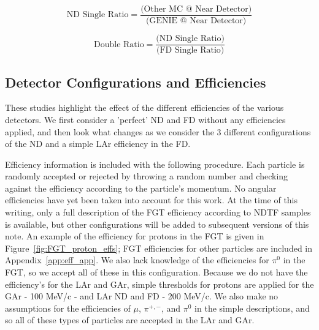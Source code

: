 \documentclass[12pt]{article}
\begin{document}
\begin{equation}
\label{eq:single_ratio}
\textrm{ND Single Ratio} = \frac{\textrm{(Other MC @ Near Detector)}}{\textrm{(GENIE @ Near Detector)}}
\end{equation}

\begin{equation}
\label{eq:double_ratio}
\textrm{Double Ratio} = \frac{\textrm{(ND Single Ratio)}}{\textrm{(FD Single Ratio)}}
\end{equation}

\subsection{Detector Configurations and Efficiencies}
\label{subsec:eff}
These studies highlight the effect of the different efficiencies of the various detectors. We first consider a 'perfect' ND and FD without any efficiencies applied, and then look what changes as we consider the 3 different configurations of the ND and a simple LAr efficiency in the FD. 

Efficiency information is included with the following procedure. Each particle is randomly accepted or rejected by throwing a random number and checking against the efficiency according to the particle's momentum. No angular efficiencies have yet been taken into account for this work. At the time of this writing, only a full description of the FGT efficiency according to NDTF samples is available, but other configurations will be added to subsequent versions of this note. An example of the efficiency for protons in the FGT is given in Figure~\ref{fig:FGT_proton_effs}; FGT efficiencies for other particles are included in Appendix~\ref{app:eff_app}. We also lack knowledge of the efficiencies for $\pi^0$ in the FGT, so we accept all of these in this configuration. Because we do not have the efficiency's for the LAr and GAr, simple thresholds for protons are applied for the GAr - 100 MeV/c - and LAr ND and FD - 200 MeV/c. We also make no assumptions for the efficiencies of $\mu$, $\pi^{+,-}$, and $\pi^{0}$ in the simple  descriptions, and so all of these types of particles are accepted in the LAr and GAr.
\end{document}
